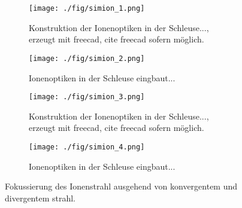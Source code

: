 \begin{figure}
    \begin{subfigure}[h]{1\textwidth}
      \texttt{[image: ./fig/simion\_1.png]}
      \caption{Konstruktion der Ionenoptiken in der Schleuse..., erzeugt mit freecad, cite freecad sofern möglich.}
      \label{fig:simion_1}
    \end{subfigure}\hfill
    \begin{subfigure}[t]{1\textwidth}
      \texttt{[image: ./fig/simion\_2.png]}
      \caption{Ionenoptiken in der Schleuse eingbaut...}
      \label{fig:simion_2}
    \end{subfigure}
    \begin{subfigure}[h]{1\textwidth}
        \texttt{[image: ./fig/simion\_3.png]}
        \caption{Konstruktion der Ionenoptiken in der Schleuse..., erzeugt mit freecad, cite freecad sofern möglich.}
        \label{fig:simion_3}
      \end{subfigure}\hfill
      \begin{subfigure}[t]{1\textwidth}
        \texttt{[image: ./fig/simion\_4.png]}
        \caption{Ionenoptiken in der Schleuse eingbaut...}
        \label{fig:simion_4}
      \end{subfigure}
    \caption{Fokussierung des Ionenstrahl ausgehend von konvergentem und divergentem strahl.} 
    \label{fig:simion_param}
\end{figure}